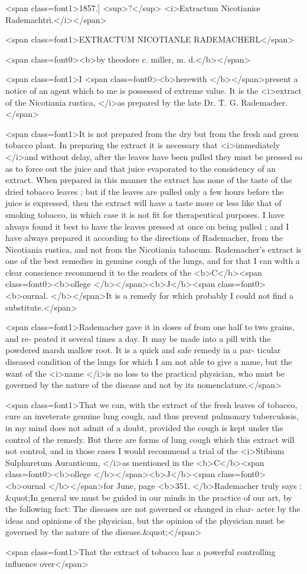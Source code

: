 <span class=font1>1857.]     <sup>?</sup>     <i>Extractum Nicotianiœ Rademachtri.</i></span>

<span class=font1>EXTRACTUM NICOTIANLE RADEMACHERL</span>

<span class=font0><b>by theodore c. miller, m. d.</b></span>

<span class=font1>I <span class=font0><b>herewith </b></span>present a notice of an agent which to me is possessed of
extreme value. It is the <i>extract of the Nicotiania rustica, </i>as prepared
by the late Dr. T. G. Rademacher.</span>

<span class=font1>It is not prepared from the dry but from the fresh and green tobacco
plant. In preparing the extract it is necessary that <i>immediately </i>and
without delay, after the leaves have been pulled they must be pressed
so as to force out the juice and that juice evaporated to the consistency
of an extract. When prepared in this manner the extract has none of
the taste of the dried tobacco leaves ; but if the leaves are pulled only
a few hours before the juice is expressed, then the extract will have a
taste more or less like that of smoking tobacco, in which case it is not
fit for therapeutical purposes. I have ahvays found it best to have the
leaves pressed at once on being pulled ; and I have always prepared it
according to the directions of Rademacher, from the Nicotiania rustica,
and not from the Nicotiania tabacum. Rademacher's extract is one of
the best remedies in genuine cough of the lungs, and for that I can wdth
a clear conscience recommend it to the readers of the <b>C</b><span class=font0><b>ollege </b></span><b>J</b><span class=font0><b>ournal.
</b></span>It is a remedy for which probably I could not find a substitute.</span>

<span class=font1>Rademacher gave it in doses of from one half to two grains, and re-
peated it several times a day. It may be made into a pill with the
powdered marsh mallow root. It is a quick and safe remedy in a par-
ticular diseased condition of the lungs for which I am not able to give
a name, but the want of the <i>name </i>is no loss to the practical physician,
who must be governed by the nature of the disease and not by its
nomenclature.</span>

<span class=font1>That we can, with the extract of the fresh leaves of tobacco, cure an
inveterate genuine lung cough, and thus prevent pulmonary tuberculosis,
in my mind does not admit of a doubt, provided the cough is kept under
the control of the remedy. But there are forms of lung cough which
this extract will not control, and in those cases I would recommend a
trial of the <i>Stibium Sulphuretum Auranticum, </i>as mentioned in the
<b>C</b><span class=font0><b>ollege </b></span><b>J</b><span class=font0><b>ournal </b></span>for June, page <b>351. </b>Rademacher truly says : &quot;In
general we must be guided in our minds in the practice of our art, by
the following fact: The diseases are not governed or changed in char-
acter by the ideas and opinions of the physician, but the opinion of
the physician must be governed by the nature of the disease.&quot;</span>

<span class=font1>That the extract of tobacco has a powerful controlling influence over</span>\endinput
